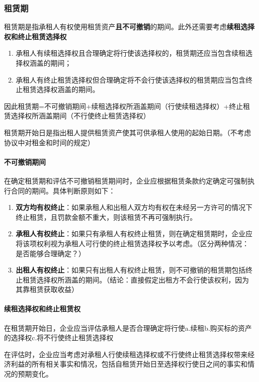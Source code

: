 \documentclass[UTF8,12pt]{ctexart}
\numberwithin{equation}{section} %
\numberwithin{figure}{section}
\numberwithin{table}{section}
\begin{document}
	\subsubsection{租赁期}
	
	租赁期是指承租人有权使用租赁资产\textbf{且不可撤销}的期间。此外还需要考虑\textbf{续租选择权和终止租赁选择权}
	\begin{enumerate}
		\item 承租人有续租选择权且合理确定将行使该选择权的，租赁期还应当包含续租选择权涵盖的期间；
		
		\item 承租人有终止租赁选择权但合理确定将不会行使该选择权的租赁期应当包含终止租赁选择权涵盖的期间。
	\end{enumerate}
	
	因此租赁期=不可撤销期间+续租选择权所涵盖期间（行使续租选择权）+终止租赁选择权所涵盖期间（不行使终止租赁选择权）

	租赁期开始日是指出租人提供租赁资产使其可供承租人使用的起始日期。（不考虑协议中对租金和时间的规定）

	\paragraph{不可撤销期间}
	在确定租赁期和评估不可撤销租赁期间时，企业应根据租赁条款约定确定可强制执行合同的期间。具体判断原则如下：
	\begin{enumerate}
		\item \textbf{双方均有权终止}：如果承租人和出租人双方均有权在未经另一方许可的情况下终止租赁，且罚款金额不重大，则该租赁不再可强制执行。
		
		\item \textbf{承租人有权终止}：如果只有承租人有权终止租赁，则在确定租赁期时，企业应将该项权利视为承租人可行使的终止租赁选择权予以考虑。（区分两种情况：是否能够合理确定？）
		
		\item \textbf{出租人有权终止}：如果只有出租人有权终止租赁，则不可撤销的租赁期包括终止租赁选择权所涵盖的期间。（结论：直接假定出租方不会行使该权利，因为其靠租赁获取收益）
	\end{enumerate}
	
	\paragraph{续租选择权和终止租赁权}
	在租赁期开始日，企业应当评估承租人是否合理确定将行使a.续租b.购买标的资产的选择权c.将不行使终止租赁选择权
	
	在评估时，企业应当考虑对承租人行使续租选择权或不行使终止租赁选择权带来经济利益的所有相关事实和情况，包括自租赁开始日至选择权行使日之间的事实和情况的预期变化。
	
\end{document}
